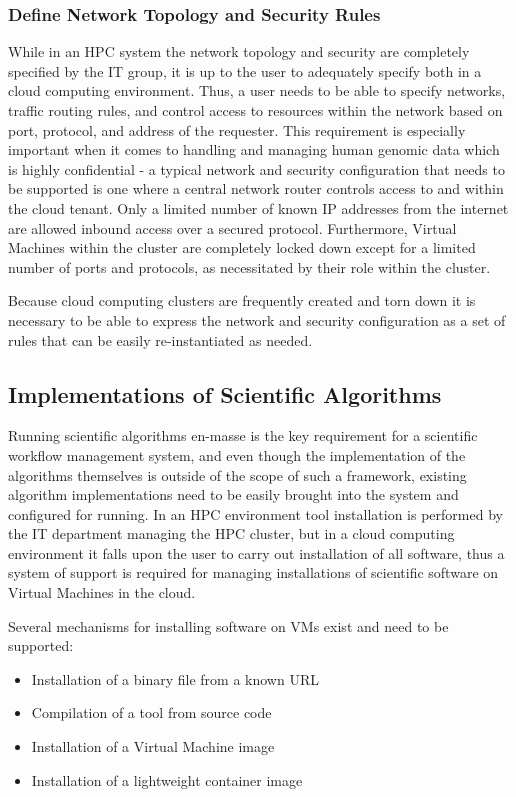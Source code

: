 \subsubsection{Define Network Topology and Security Rules}
While in an HPC system the network topology and security are completely specified by the IT group, it is up to the user to adequately specify both in a cloud computing environment. Thus, a user needs to be able to specify networks, traffic routing rules, and control access to resources within the network based on port, protocol, and address of the requester. This requirement is especially important when it comes to handling and managing human genomic data which is highly confidential - a typical network and security configuration that needs to be supported is one where a central network router controls access to and within the cloud tenant. Only a limited number of known IP addresses from the internet are allowed inbound access over a secured protocol. Furthermore, Virtual Machines within the cluster are completely locked down except for a limited number of ports and protocols, as necessitated by their role within the cluster.

Because cloud computing clusters are frequently created and torn down it is necessary to be able to express the network and security configuration as a set of rules that can be easily re-instantiated as needed.

\subsection {Implementations of Scientific Algorithms} \label{sec:algorithm_implementation}
Running scientific algorithms en-masse is the key requirement for a scientific workflow management system, and even though the implementation of the algorithms themselves is outside of the scope of such a framework, existing algorithm implementations need to be easily brought into the system and configured for running.  In an HPC environment tool installation is performed by the IT department managing the HPC cluster, but in a cloud computing environment it falls upon the user to carry out installation of all software, thus a system of support is required for managing installations of scientific software on Virtual Machines in the cloud.

Several mechanisms for installing software on VMs exist and need to be supported:
\begin{itemize}
\item Installation of a binary file from a known URL
\item Compilation of a tool from source code
\item Installation of a Virtual Machine image
\item Installation of a lightweight container image
\end{itemize}

